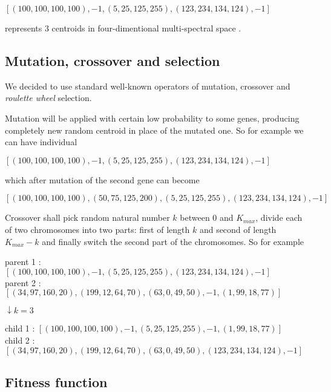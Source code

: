 \documentclass[11pt,leqno]{article}
\theoremstyle{mytheoremstyle}
\theoremstyle{mytheoremstyle}
\begin{document}
\begin{center}
$[(100,100,100,100), -1, (5,25,125,255), (123,234,134,124), -1]$
\end{center}

\noindent represents 3 centroids in four-dimentional multi-spectral space  .

\subsection{Mutation, crossover and selection}

We decided to use standard well-known operators of mutation, crossover and \textit{roulette wheel} selection. 

Mutation will be applied with certain low probability to some genes, producing completely new random centroid in place of the mutated one. So for example we can have individual

\begin{center}
$[(100,100,100,100), -1, (5,25,125,255), (123,234,134,124), -1]$
\end{center}

\noindent which after mutation of the second gene can become

\begin{center}
$[(100,100,100,100), (50, 75, 125, 200), (5,25,125,255), (123,234,134,124), -1]$
\end{center}

Crossover shall pick random natural number $k$ between 0 and $K_{max}$, divide each of two chromosomes into two parts: first of length $k$ and second of length $K_{max} - k$ and finally switch the second part of the chromosomes. So for example

\begin{center}
parent 1 : $[(100,100,100,100), -1, (5,25,125,255), (123,234,134,124), -1]$\\
parent 2 : $[(34,97,160,20), (199,12,64,70), (63,0,49,50), -1, (1,99,18,77)]$


$\downarrow k = 3$

child 1 : $[(100,100,100,100), -1, (5,25,125,255), -1, (1,99,18,77)]$\\
child 2 : $[(34,97,160,20), (199,12,64,70), (63,0,49,50), (123,234,134,124), -1]$
\end{center}

\subsection{Fitness function}
\end{document}
